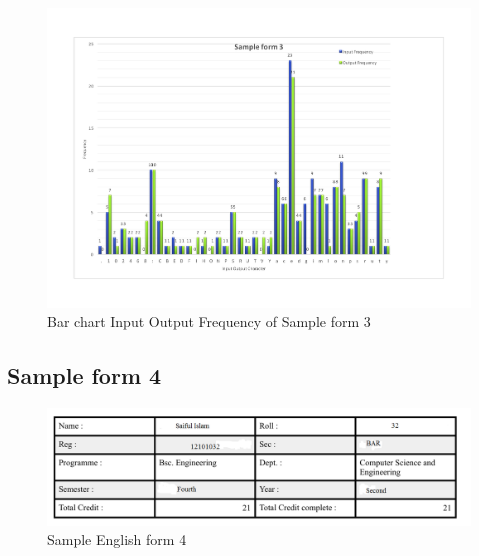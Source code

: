 \begin{figure}[H]
\centering
\includegraphics[width=1\textwidth]{form3.pdf}
\caption {Bar chart Input Output Frequency of Sample form 3}
\label {fig:bar3}
\end{figure}


\subsection{Sample form 4}

\begin{figure}[H]
\centering
\includegraphics[width=1\textwidth]{form4.png}
\caption {Sample English form 4}
\label {fig:form4}
\end{figure}

